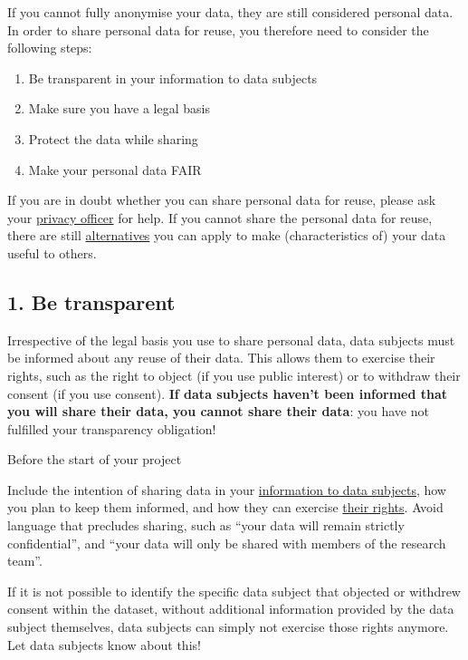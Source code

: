 \documentclass[
]{book}
\providecommand{\tightlist}{%
  \setlength{\itemsep}{0pt}\setlength{\parskip}{0pt}}
\begin{document}
If you cannot fully anonymise your data, they are still considered personal data.
In order to share personal data for reuse, you therefore need to consider the
following steps:

\begin{enumerate}
\def\labelenumi{\arabic{enumi}.}
\tightlist
\item
  Be transparent in your information to data subjects
\item
  Make sure you have a legal basis
\item
  Protect the data while sharing
\item
  Make your personal data FAIR
\end{enumerate}

If you are in doubt whether you can share personal data for reuse, please ask
your \protect\hyperlink{support}{privacy officer} for help. If you cannot share the personal data
for reuse, there are still \protect\hyperlink{sharing-reuse-alternatives}{alternatives} you can
apply to make (characteristics of) your data useful to others.

\hypertarget{transparent-reuse}{%
\subsection{1. Be transparent}\label{transparent-reuse}}

Irrespective of the legal basis you use to share personal data, data subjects
must be informed about any reuse of their data. This allows them to exercise
their rights, such as the right to object (if you use public interest) or to
withdraw their consent (if you use consent). \textbf{If data subjects haven't been
informed that you will share their data, you cannot share their data}: you have
not fulfilled your transparency obligation!

Before the start of your project

Include the intention of sharing data in your
\protect\hyperlink{privacy-notices}{information to data subjects}, how you plan to keep them
informed, and how they can exercise \protect\hyperlink{data-subject-rights}{their rights}.
Avoid language that precludes sharing, such as ``your data will remain strictly
confidential'', and ``your data will only be shared with members of the research
team''.

If it is not possible to identify the specific data subject that objected or
withdrew consent within the dataset, without additional information provided
by the data subject themselves, data subjects can simply not exercise those
rights anymore. Let data subjects know about this!
\end{document}
